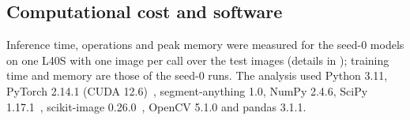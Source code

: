 \subsection*{Computational cost and software}
Inference time, operations and peak memory were measured for the seed-0 models on one L40S with one image per call over
the test images (details in ); training time and memory are those of the seed-0 runs. The analysis used
Python 3.11, PyTorch 2.14.1 (CUDA 12.6)~\cite{paszke2019pytorch}, segment-anything 1.0, NumPy 2.4.6, SciPy
1.17.1~\cite{virtanen2020scipy}, scikit-image 0.26.0~\cite{vanderwalt2014skimage}, OpenCV 5.1.0 and pandas 3.1.1.
